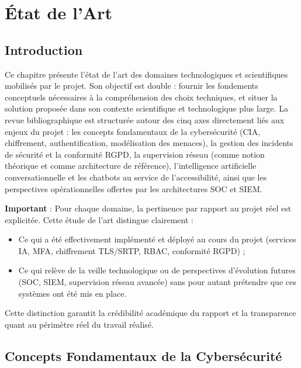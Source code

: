 \chapter{État de l'Art}

\section*{Introduction}
Ce chapitre présente l'état de l'art des domaines technologiques et scientifiques mobilisés par le projet. Son objectif est double : fournir les fondements conceptuels nécessaires à la compréhension des choix techniques, et situer la solution proposée dans son contexte scientifique et technologique plus large. La revue bibliographique est structurée autour des cinq axes directement liés aux enjeux du projet : les concepts fondamentaux de la cybersécurité (CIA, chiffrement, authentification, modélisation des menaces), la gestion des incidents de sécurité et la conformité RGPD, la supervision réseau (comme notion théorique et comme architecture de référence), l'intelligence artificielle conversationnelle et les chatbots au service de l'accessibilité, ainsi que les perspectives opérationnelles offertes par les architectures SOC et SIEM.

\textbf{Important} : Pour chaque domaine, la pertinence par rapport au projet réel est explicitée. Cette étude de l'art distingue clairement :
\begin{itemize}
    \item Ce qui a été effectivement implémenté et déployé au cours du projet (services IA, MFA, chiffrement TLS/SRTP, RBAC, conformité RGPD) ;
    \item Ce qui relève de la veille technologique ou de perspectives d'évolution futures (SOC, SIEM, supervision réseau avancée) sans pour autant prétendre que ces systèmes ont été mis en place.
\end{itemize}

Cette distinction garantit la crédibilité académique du rapport et la transparence quant au périmètre réel du travail réalisé.

\section{Concepts Fondamentaux de la Cybersécurité}

